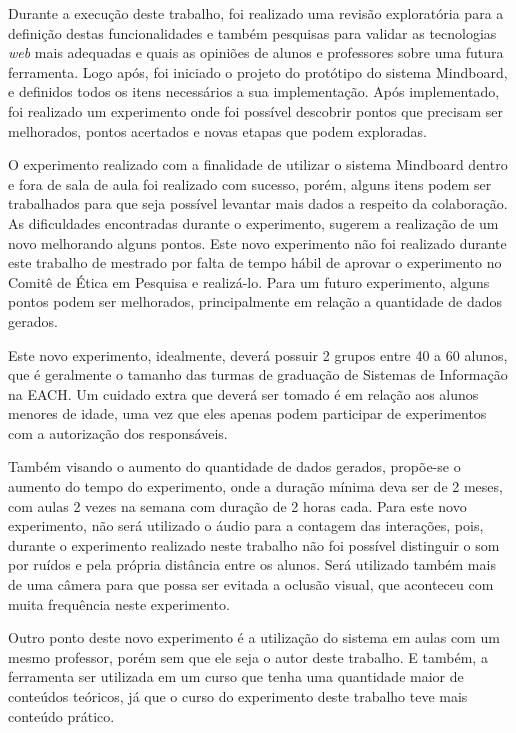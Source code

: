Durante a execução deste trabalho, foi realizado uma revisão exploratória para a definição destas funcionalidades e também pesquisas para validar as tecnologias \emph{web} mais adequadas e quais as opiniões de alunos e professores sobre uma futura ferramenta. Logo após, foi iniciado o projeto do protótipo do sistema Mindboard, e definidos todos os itens necessários a sua implementação. Após implementado, foi realizado um experimento onde foi possível descobrir pontos que precisam ser melhorados, pontos acertados e novas etapas que podem exploradas.

O experimento realizado com a finalidade de utilizar o sistema Mindboard dentro e fora de sala de aula foi realizado com sucesso, porém, alguns itens podem ser trabalhados para que seja possível levantar mais dados a respeito da colaboração. As dificuldades encontradas durante o experimento, sugerem a realização de um novo melhorando alguns pontos. Este novo experimento não foi realizado durante este trabalho de mestrado por falta de tempo hábil de aprovar o experimento no Comitê de Ética em Pesquisa e realizá-lo. Para um futuro experimento, alguns pontos podem ser melhorados, principalmente em relação a quantidade de dados gerados.

Este novo experimento, idealmente, deverá possuir 2 grupos entre 40 a 60 alunos, que é geralmente o tamanho das turmas de graduação de Sistemas de Informação na EACH. Um cuidado extra que deverá ser tomado é em relação aos alunos menores de idade, uma vez que eles apenas podem participar de experimentos com a autorização dos responsáveis.

Também visando o aumento do quantidade de dados gerados, propõe-se o aumento do tempo do experimento, onde a duração mínima deva ser de 2 meses, com aulas 2 vezes na semana com duração de 2 horas cada. Para este novo experimento, não será utilizado o áudio para a contagem das interações, pois, durante o experimento realizado neste trabalho não foi possível distinguir o som por ruídos e pela própria distância entre os alunos. Será utilizado também mais de uma câmera para que possa ser evitada a oclusão visual, que aconteceu com muita frequência neste experimento.

Outro ponto deste novo experimento é a utilização do sistema em aulas com um mesmo professor, porém sem que ele seja o autor deste trabalho. E também, a ferramenta ser utilizada em um curso que tenha uma quantidade maior de conteúdos teóricos, já que o curso do experimento deste trabalho teve mais conteúdo prático.

